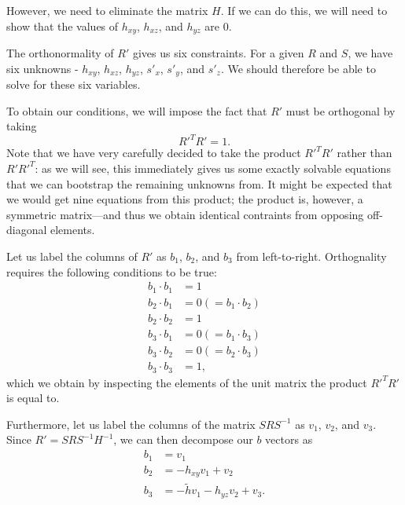 \documentclass{article}
\begin{document}
However, we need to eliminate the matrix $H$. If we can do this, we will need to show that the values of $h_{xy}$, $h_{xz}$, and $h_{yz}$ are 0.

The orthonormality of $R'$ gives us six constraints. For a given $R$ and $S$, we have six unknowns - $h_{xy}$, $h_{xz}$, $h_{yz}$, $s'_x$, $s'_y$, and $s'_z$. We should therefore be able to solve for these six variables.

To obtain our conditions, we will impose the fact that $R'$ must be orthogonal by taking
\begin{equation}
R'^T R' = 1.
\end{equation}
Note that we have very carefully decided to take the product $R'^T R'$ rather than $R' R'^T$: as we will see, this immediately gives us some exactly solvable equations that we can bootstrap the remaining unknowns from. It might be expected that we would get nine equations from this product; the product is, however, a symmetric matrix---and thus we obtain identical contraints from opposing off-diagonal elements.

Let us label the columns of $R'$ as $b_1$, $b_2$, and $b_3$ from left-to-right. Orthognality requires the following conditions to be true:
\begin{align}
\label{EQUATION::ShearB1B1} b_1 \cdot b_1 &= 1\\
\label{EQUATION::ShearB2B1} b_2 \cdot b_1 &= 0 (= b_1 \cdot b_2)\\
\label{EQUATION::ShearB2B2} b_2 \cdot b_2 &= 1\\
\label{EQUATION::ShearB3B1} b_3 \cdot b_1 &= 0(= b_1 \cdot b_3)\\
\label{EQUATION::ShearB3B2} b_3 \cdot b_2 &= 0(= b_2 \cdot b_3)\\
\label{EQUATION::ShearB3B3} b_3 \cdot b_3 &= 1,
\end{align}
which we obtain by inspecting the elements of the unit matrix the product $R'^T R'$ is equal to.

Furthermore, let us label the columns of the matrix $SRS^{-1}$ as $v_1$, $v_2$, and $v_3$. Since $R' = SRS^{-1} H^{-1}$, we can then decompose our $b$ vectors as
\begin{align}
\label{EQUATION::ShearB1} b_1 &= v_1\\
\label{EQUATION::ShearB2} b_2 &= -h_{xy}v_1 + v_2\\
\label{EQUATION::ShearB3} b_3 &= -\widetilde{h} v_1 - h_{yz} v_2 + v_3.
\end{align}
\end{document}
